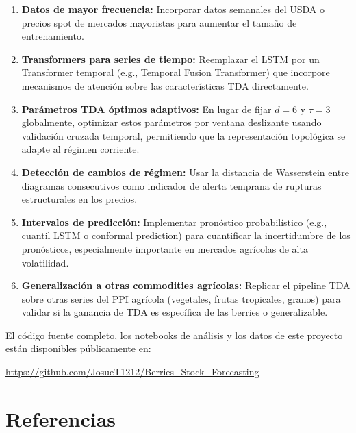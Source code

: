 \documentclass[12pt, a4paper]{article}
\begin{document}
\begin{enumerate}[leftmargin=1.5em]
  \item \textbf{Datos de mayor frecuencia:} Incorporar datos semanales del USDA o precios spot
        de mercados mayoristas para aumentar el tamaño de entrenamiento.

  \item \textbf{Transformers para series de tiempo:} Reemplazar el LSTM por un Transformer
        temporal (e.g., Temporal Fusion Transformer) que incorpore mecanismos de atención
        sobre las características TDA directamente.

  \item \textbf{Parámetros TDA óptimos adaptivos:} En lugar de fijar $d = 6$ y $\tau = 3$
        globalmente, optimizar estos parámetros por ventana deslizante usando validación cruzada
        temporal, permitiendo que la representación topológica se adapte al régimen corriente.

  \item \textbf{Detección de cambios de régimen:} Usar la distancia de Wasserstein entre
        diagramas consecutivos como indicador de alerta temprana de rupturas estructurales
        en los precios.

  \item \textbf{Intervalos de predicción:} Implementar pronóstico probabilístico (e.g.,
        cuantil LSTM o conformal prediction) para cuantificar la incertidumbre de los pronósticos,
        especialmente importante en mercados agrícolas de alta volatilidad.

  \item \textbf{Generalización a otras commodities agrícolas:} Replicar el pipeline TDA sobre
        otras series del PPI agrícola (vegetales, frutas tropicales, granos) para validar si
        la ganancia de TDA es específica de las berries o generalizable.
\end{enumerate}

El código fuente completo, los notebooks de análisis y los datos de este proyecto están
disponibles públicamente en:
\begin{center}
  \url{https://github.com/JosueT1212/Berries_Stock_Forecasting}
\end{center}

\newpage
\section*{\color{tecblue}Referencias}
\end{document}
